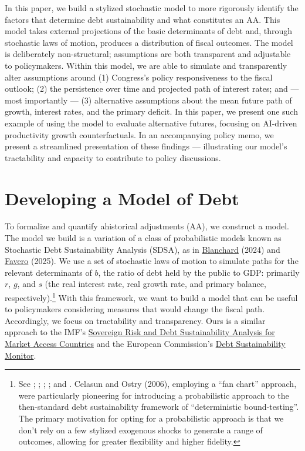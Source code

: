 \documentclass[12pt]{article}
\begin{document}
In this paper, we build a stylized stochastic model to more rigorously identify the factors that determine debt sustainability and what constitutes an AA. This model takes external projections of the basic determinants of debt and, through stochastic laws of motion, produces a distribution of fiscal outcomes. The model is deliberately non-structural; assumptions are both transparent and adjustable to policymakers. Within this model, we are able to simulate and transparently alter assumptions around (1) Congress's policy responsiveness to the fiscal outlook; (2) the persistence over time and projected path of interest rates; and --- most importantly --- (3) alternative assumptions about the mean future path of growth, interest rates, and the primary deficit. In this paper, we present one such example of using the model to evaluate alternative futures, focusing on AI-driven productivity growth counterfactuals. In an accompanying policy memo, we present a streamlined presentation of these findings --- illustrating our model's tractability and capacity to contribute to policy discussions.

\section{Developing a Model of Debt}

To formalize and quantify ahistorical adjustments (AA), we construct a model. The model we build is a variation of a class of probabilistic models known as Stochastic Debt Sustainability Analysis (SDSA), as in \href{https://direct.mit.edu/books/oa-monograph/5522/Fiscal-Policy-under-Low-Interest-Rates}{Blanchard} (2024) and \href{https://didattica.unibocconi.it/mypage/dwload.php?nomefile=Fiscal_Macro_2025_(3)20250403120402.pdf}{Favero} (2025). We use a set of stochastic laws of motion to simulate paths for the relevant determinants of $b$, the ratio of debt held by the public to GDP: primarily $r$, $g$, and $s$ (the real interest rate, real growth rate, and primary balance, respectively).\footnote{See \textcite{celasun_2006}; \textcite{cottarelli_2011}; \textcite{berti_2013}; \textcite{demirel_2022}; and \textcite{auerbach2025robust}. Celasun and Ostry (2006), employing a ``fan chart'' approach, were particularly pioneering for introducing a probabilistic approach to the then-standard debt sustainability framework of ``deterministic bound-testing''. The primary motivation for opting for a probabilistic approach is that we don't rely on a few stylized exogenous shocks to generate a range of outcomes, allowing for greater flexibility and higher fidelity.}  With this framework, we want to build a model that can be useful to policymakers considering measures that would change the fiscal path. Accordingly, we focus on tractability and transparency. Ours is a similar approach to the IMF's \href{https://www.imf.org/en/Publications/DSA/sovereign-risk-and-debt-sustainability-analysis-for-market-access-countries}{Sovereign Risk and Debt Sustainability Analysis for Market Access Countries} and the European Commission's \href{https://economy-finance.ec.europa.eu/publications/debt-sustainability-monitor-2024_en}{Debt Sustainability Monitor}.
\end{document}
